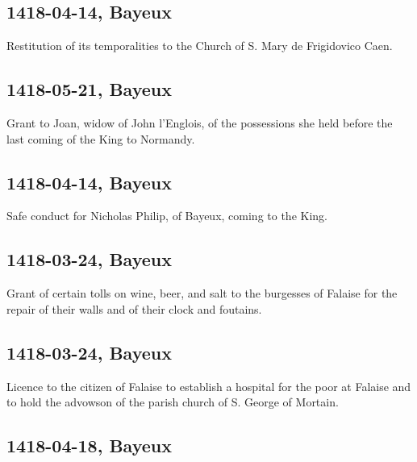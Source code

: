 \documentclass[a4paper,12pt,twoside]{book}
\begin{document}
                
                \subsection{1418-04-14, Bayeux}
                
                
                     Restitution of its temporalities to the Church of S. Mary de Frigidovico Caen.
                  
                
                \subsection{1418-05-21, Bayeux}
                
                
                     Grant to Joan, widow of John l'Englois, of the possessions she held before the last coming of the King to Normandy.
                  
                
                \subsection{1418-04-14, Bayeux}
                
                
                     Safe conduct for Nicholas Philip, of Bayeux, coming to the King.
                  
                
                \subsection{1418-03-24, Bayeux}
                
                
                     Grant of certain tolls on wine, beer, and salt to the burgesses of Falaise for the repair of their walls and of their clock and foutains.
                  
                
                \subsection{1418-03-24, Bayeux}
                
                
                     Licence to the citizen of Falaise to establish a hospital for the poor at Falaise and to hold the advowson of the parish church of S. George of Mortain.
                  
                
                \subsection{1418-04-18, Bayeux}
                
\end{document}
